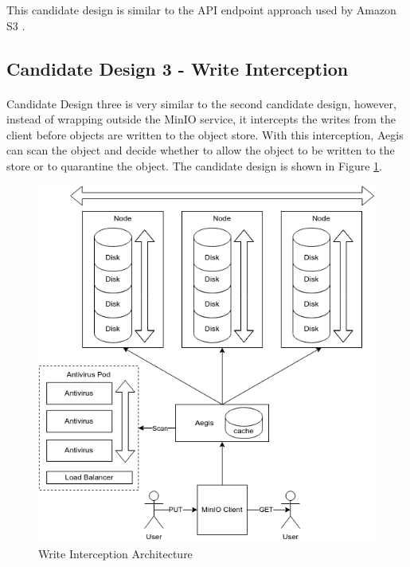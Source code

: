 \documentclass[12pt, conference, final, a4paper, onecolumn, compsoc]{IEEEtran}
\begin{document}
This candidate design is similar to the API endpoint approach used by Amazon S3
\citep{amazon-md}.

\subsection{Candidate Design 3 - Write Interception}
\paragraph{}

Candidate Design three is very similar to the second candidate design, however,
instead of wrapping outside the MinIO service, it intercepts the writes from the
client before objects are written to the object store. With this interception,
Aegis can scan the object and decide whether to allow the object to be written
to the store or to quarantine the object. The candidate design is shown in
Figure \ref{fig:writeInterceptArch}.

\begin{figure}
  \centering \includegraphics[scale=.4]{diagrams/write-intercept.png}
  \caption{Write Interception Architecture}
  \label{fig:writeInterceptArch}
\end{figure}
\end{document}
